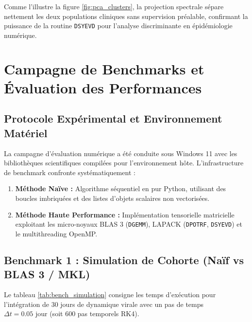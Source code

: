 \documentclass[11pt,a4paper]{report}
\theoremstyle{plain}
\theoremstyle{definition}
\theoremstyle{remark}
\begin{document}
Comme l'illustre la figure \ref{fig:pca_clusters}, la projection spectrale sépare nettement les deux populations cliniques sans supervision préalable, confirmant la puissance de la routine \texttt{DSYEVD} pour l'analyse discriminante en épidémiologie numérique.

\chapter{Campagne de Benchmarks et Évaluation des Performances}

\section{Protocole Expérimental et Environnement Matériel}
La campagne d'évaluation numérique a été conduite sous Windows 11 avec les bibliothèques scientifiques compilées pour l'environnement hôte. L'infrastructure de benchmark confronte systématiquement :
\begin{enumerate}
    \item \textbf{Méthode Naïve :} Algorithme séquentiel en pur Python, utilisant des boucles imbriquées et des listes d'objets scalaires non vectorisées.
    \item \textbf{Méthode Haute Performance :} Implémentation tensorielle matricielle exploitant les micro-noyaux BLAS 3 (\texttt{DGEMM}), LAPACK (\texttt{DPOTRF}, \texttt{DSYEVD}) et le multithreading OpenMP.
\end{enumerate}

\section{Benchmark 1 : Simulation de Cohorte (Naïf vs BLAS 3 / MKL)}
Le tableau \ref{tab:bench_simulation} consigne les temps d'exécution pour l'intégration de 30 jours de dynamique virale avec un pas de temps $\Delta t = 0.05\text{ jour}$ (soit 600 pas temporels RK4).
\end{document}
